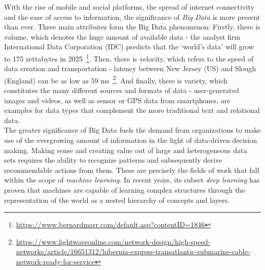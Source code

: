 With the rise of mobile and social platforms, the spread of internet connectivity and the ease of access to information, the significance of \textit{Big Data} is more present than ever. Three main attributes form the Big Data phenomenon: Firstly, there is volume, which denotes the huge amount of available data - the analyst firm International Data Corporation (IDC) predicts that the `world's data' will grow to 175 zettabytes in 2025~\footnote{\url{https://www.bernardmarr.com/default.asp?contentID=1846}}. Then, there is velocity, which refers to the speed of data creation and transportation - latency between New Jersey (US) and Slough (England) can be as low as 59 ms~\footnote{\url{https://www.lightwaveonline.com/network-design/high-speed-networks/article/16651312/hibernia-express-transatlantic-submarine-cable-network-ready-for-service}}. And finally, there is variety, which constitutes the many different sources and formats of data - user-generated images and videos, as well as sensor or GPS data from smartphones, are examples for data types that complement the more traditional text and relational data. \\
The greater significance of Big Data fuels the demand from organizations to make use of the evergrowing amount of information in the light of data-driven decision making. Making sense and creating value out of large and heterogeneous data sets requires the ability to recognize patterns and subsequently derive recommendable actions from them. These are precisely the fields of work that fall within the scope of \textit{machine learning}. In recent years, its subset \textit{deep learning} has proven that machines are capable of learning complex structures through the representation of the world as a nested hierarchy of concepts and layers.

